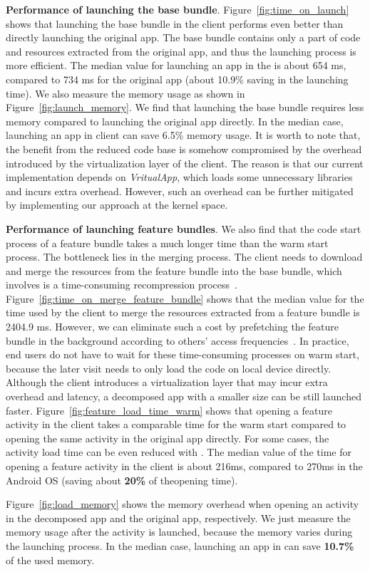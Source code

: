 \noindent \textbf{Performance of launching the base bundle}. Figure~\ref{fig:time_on_launch} shows that launching the base bundle in the \nickName{} client performs even better than directly launching the original app. The base bundle contains only a part of code and resources extracted from the original app, and thus the launching process is more efficient. The median value for launching an app in the \nickName{} is about 654 ms, compared to 734 ms for the original app (about 10.9\% saving in the launching time). We also measure the memory usage as shown in Figure~\ref{fig:launch_memory}. We find that launching the base bundle requires less memory compared to launching the original app directly. In the median case, launching an app in \nickName{} client can save 6.5\% memory usage. It is worth to note that, the benefit from the reduced code base is somehow compromised by the overhead introduced by the virtualization layer of the \nickName{} client.
The reason is that our current implementation depends on \textit{VritualApp}, which loads some unnecessary libraries and incurs extra overhead. However, such an overhead can be further mitigated by implementing our approach at the kernel space. 



\noindent \textbf{Performance of launching feature bundles}. We also find that the code start process of a feature bundle takes a much longer time than the warm start process. The bottleneck lies in the merging process. The \nickName{} client needs to download and merge the resources from the feature bundle into the base bundle, which involves is a time-consuming recompression process~\cite{incrementalupdate}.  Figure~\ref{fig:time_on_merge_feature_bundle} shows that the median value for the time used by the \nickName client to merge the resources extracted from a feature bundle is 2404.9 ms. However, we can eliminate such a cost by prefetching the feature bundle in the background according to others' access frequencies~\cite{WWW2010Zhou}. In practice, end users do not have to wait for these time-consuming processes on warm start, because the later visit needs to only load the code on local device directly. Although the \nickName{} client introduces a virtualization layer that may incur extra overhead and latency, a decomposed app with a smaller size can be still launched faster. Figure~\ref{fig:feature_load_time_warm} shows that opening a feature activity in the \nickName client takes a comparable time for the warm start compared to opening the same activity in the original app directly. For some cases, the activity load time can be even reduced with \nickName{}. The median value of the time for opening a feature activity in the \nickName{} client is about 216ms, compared to 270ms in the Android OS (saving about \textbf{20\%} of theopening time).



Figure~\ref{fig:load_memory} shows the memory overhead when opening an activity in the decomposed app and the original app, respectively. We just measure the memory usage after the activity is launched, because the memory varies during the launching process. In the median case, launching an app in \nickName{} can save \textbf{10.7\%} of the used memory.



